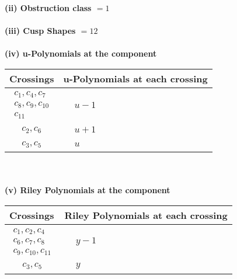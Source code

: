 \documentclass[1p]{elsarticle_modified}
\theoremstyle{definition}
\begin{document}
\flushleft \textbf{(ii) Obstruction class $= 1$}\\~\\
\flushleft \textbf{(iii) Cusp Shapes $= 12$}\\~\\
\newpage\renewcommand{\arraystretch}{1}
\flushleft \textbf{(iv) u-Polynomials at the component}\newline \\
\begin{tabular}{m{50pt}|m{274pt}}
Crossings & \hspace{64pt}u-Polynomials at each crossing \\
\hline $$\begin{aligned}c_{1},c_{4},c_{7}\\c_{8},c_{9},c_{10}\\c_{11}\end{aligned}$$&$\begin{aligned}
&u-1
\end{aligned}$\\
\hline $$\begin{aligned}c_{2},c_{6}\end{aligned}$$&$\begin{aligned}
&u+1
\end{aligned}$\\
\hline $$\begin{aligned}c_{3},c_{5}\end{aligned}$$&$\begin{aligned}
&u
\end{aligned}$\\
\hline
\end{tabular}\\~\\
\newpage\renewcommand{\arraystretch}{1}
\flushleft \textbf{(v) Riley Polynomials at the component}\newline \\
\begin{tabular}{m{50pt}|m{274pt}}
Crossings & \hspace{64pt}Riley Polynomials at each crossing \\
\hline $$\begin{aligned}c_{1},c_{2},c_{4}\\c_{6},c_{7},c_{8}\\c_{9},c_{10},c_{11}\end{aligned}$$&$\begin{aligned}
&y-1
\end{aligned}$\\
\hline $$\begin{aligned}c_{3},c_{5}\end{aligned}$$&$\begin{aligned}
&y
\end{aligned}$\\
\hline
\end{tabular}\\~\\
\end{document}
